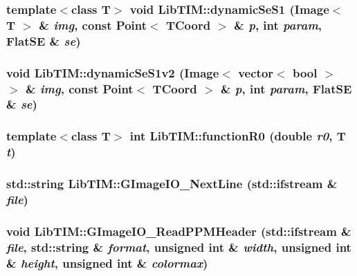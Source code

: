 \subsubsection{\setlength{\rightskip}{0pt plus 5cm}template$<$class T$>$ void Lib\-TIM::dynamic\-Se\-S1 (Image$<$ T $>$ \& {\em img}, const Point$<$ {\bf TCoord} $>$ \& {\em p}, int {\em param}, Flat\-SE \& {\em se})}\label{namespaceLibTIM_a20}


\subsubsection{\setlength{\rightskip}{0pt plus 5cm}void Lib\-TIM::dynamic\-Se\-S1v2 (Image$<$ vector$<$ bool $>$ $>$ \& {\em img}, const Point$<$ {\bf TCoord} $>$ \& {\em p}, int {\em param}, Flat\-SE \& {\em se})\hspace{0.3cm}{\tt  [inline]}}\label{namespaceLibTIM_a21}


\subsubsection{\setlength{\rightskip}{0pt plus 5cm}template$<$class T$>$ int Lib\-TIM::function\-R0 (double {\em r0}, T {\em t})}\label{namespaceLibTIM_a96}


\subsubsection{\setlength{\rightskip}{0pt plus 5cm}std::string Lib\-TIM::GImage\-IO\_\-Next\-Line (std::ifstream \& {\em file})\hspace{0.3cm}{\tt  [inline]}}\label{namespaceLibTIM_a107}


\subsubsection{\setlength{\rightskip}{0pt plus 5cm}void Lib\-TIM::GImage\-IO\_\-Read\-PPMHeader (std::ifstream \& {\em file}, std::string \& {\em format}, unsigned int \& {\em width}, unsigned int \& {\em height}, unsigned int \& {\em colormax})\hspace{0.3cm}{\tt  [inline]}}\label{namespaceLibTIM_a108}


